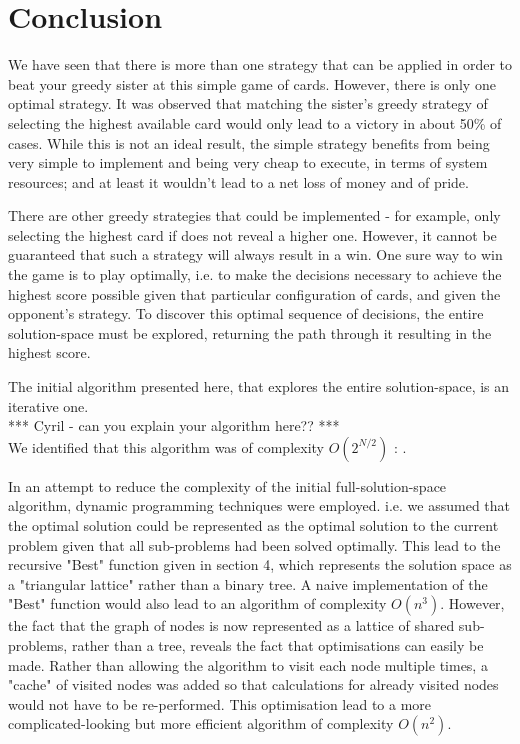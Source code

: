 \documentclass[11pt]{article}
\begin{document}
\section{Conclusion}

We have seen that there is more than one strategy that can be applied in order to beat your greedy sister at this simple game of cards. However, there is only one optimal strategy. It was observed that matching the sister's greedy strategy of selecting the highest available card would only lead to a victory in about 50\% of cases. While this is not an ideal result, the simple strategy benefits from being very simple to implement and being very cheap to execute, in terms of system resources; and at least it wouldn't lead to a net loss of money and of pride.

There are other greedy strategies that could be implemented - for example, only selecting the highest card if does not reveal a higher one. However, it cannot be guaranteed that such a strategy will always result in a win. One sure way to win the game is to play optimally, i.e. to make the decisions necessary to achieve the highest score possible given that particular configuration of cards, and given the opponent's strategy. To discover this optimal sequence of decisions, the entire solution-space must be explored, returning the path through it resulting in the highest score.

The initial algorithm presented here, that explores the entire solution-space, is an iterative one.\\
*** Cyril - can you explain your algorithm here?? ***\\
We identified that this algorithm was of complexity  $O(2^{N/2})$ : .

In an attempt to reduce the complexity of the initial full-solution-space algorithm, dynamic programming techniques were employed. i.e. we assumed that the optimal solution could be represented as the optimal solution to the current problem given that all sub-problems had been solved optimally. This lead to the recursive "Best" function given in section 4, which represents the solution space as a "triangular lattice" rather than a binary tree. A naive implementation of the "Best" function would also lead to an algorithm of complexity $O(n^3)$. However, the fact that the graph of nodes is now represented as a lattice of shared sub-problems, rather than a tree, reveals the fact that optimisations can easily be made. Rather than allowing the algorithm to visit each node multiple times, a "cache" of visited nodes was added so that calculations for already visited nodes would not have to be re-performed. This optimisation lead to a more complicated-looking but more efficient algorithm of complexity $O(n^2)$.



\end{document}
